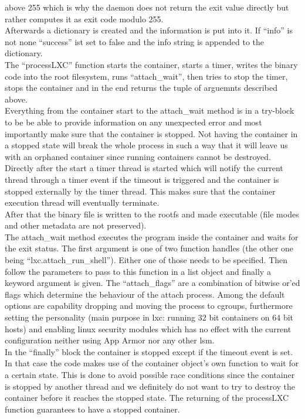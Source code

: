above 255 which is why the daemon does not return the exit value directly but rather computes it as exit code modulo
255.\\
Afterwards a dictionary is created and the information is put into it. If ``info'' is not none ``success'' ist set to false
and the info string is appended to the dictionary.\\
The ``processLXC'' function starts the container, starts a timer, writes the binary code into the root filesystem, runs
``attach\_wait'', then tries to stop the timer, stops the container and in the end returns the tuple of arguemnts
described above.\\
Everything from the container start to the attach\_wait method is in a try-block to be be able to provide information on
any unexpected error and most importantly make sure that the container is stopped. Not having the container in a stopped
state will break the whole process in such a way that it will leave us with an orphaned container since running containers
cannot be destroyed.\\
Directly after the start a timer thread is started which will notify the current thread through a timer event if the
timeout is triggered and the container is stopped externally by the timer thread. This makes sure that the container
execution thread will eventually terminate.\\
After that the binary file is written to the rootfs and made executable (file modes and other metadata are not preserved).\\
The attach\_wait method executes the program inside the container and waits for the exit status\cite{attachwait}. The first argument is
one of two function handles (the other one being ``lxc.attach\_run\_shell''). Either one of those needs to be specified. Then
follow the parameters to pass to this function in a list object and finally a keyword argument is given. The
``attach\_flags'' are a combination of bitwise or'ed flags which determine the behaviour of the attach process. Among
the default options are capability dropping and moving the process to cgroups, furthermore setting the personality
(main purpose in lxc: running 32 bit containers on 64 bit hosts)\cite{personality} and enabling linux security modules
which has no effect with the current configuration neither using App Armor nor any other lsm.\\
In the ``finally'' block the container is stopped except if the timeout event is set. In that case the code makes use of
the container object's own function to wait for a certain state. This is done to avoid possible race conditions since
the container is stopped by another thread and we definitely do not want to try to destroy the container before it
reaches the stopped state. The returning of the processLXC function guarantees to have a stopped container.

